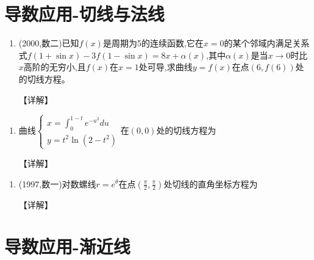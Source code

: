 \documentclass[12pt, a4paper, oneside, UTF8]{ctexbook}
\begin{document}
\section{导数应用-切线与法线}

\begin{remark}
\end{remark}

\begin{enumerate}[label=\arabic*.,start=10]
    \item  (2000,数二)已知$f(x)$是周期为5的连续函数,它在$x=0$的某个邻域内满足关系式$f(1+\sin x)-3f(1-\sin x)=8x+\alpha(x)$,其中$\alpha(x)$是当$x\to0$时比$x$高阶的无穷小,且$f(x)$在$x=1$处可导,求曲线$y=f(x)$在点$(6,f(6))$处的切线方程。
    
    \begin{solution}
    【详解】
    \end{solution}
\end{enumerate}

\begin{remark}
\end{remark}

\begin{enumerate}[label=\arabic*.,start=11]
    \item  曲线$\begin{cases}
        x=\int_0^{1-t}e^{-u^2}du \\
        y=t^2\ln(2-t^2)
    \end{cases}$在$(0,0)$处的切线方程为\underline{\quad}
    
    \begin{solution}
    【详解】
    \end{solution}
\end{enumerate}

\begin{remark}
\end{remark}

\begin{enumerate}[label=\arabic*.,start=12]
    \item  (1997,数一)对数螺线$r=e^\theta$在点$(\frac{\pi}{2},\frac{\pi}{2})$处切线的直角坐标方程为\underline{\quad}
    
    \begin{solution}
    【详解】
    \end{solution}
\end{enumerate}

\section{导数应用-渐近线}
\end{document}
